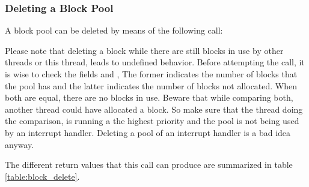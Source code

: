 
\subsubsection{Deleting a Block Pool}

A block pool can be deleted by means of the following call:


Please note that deleting a block while there are still blocks in use by
other threads or this thread, leads to undefined behavior. Before
attempting the call, it is wise to check the fields
 and
, The former indicates the number of
blocks that the pool has and the latter indicates the number of blocks not
allocated. When both are equal, there are no blocks in use. Beware that
while comparing both, another thread could have allocated a block. So make
sure that the thread doing the comparison, is running a the highest priority
and the pool is not being used by an interrupt handler. Deleting a pool of
an interrupt handler is a bad idea anyway.

The different return values that this call can produce are summarized
in table \ref{table:block_delete}.  

